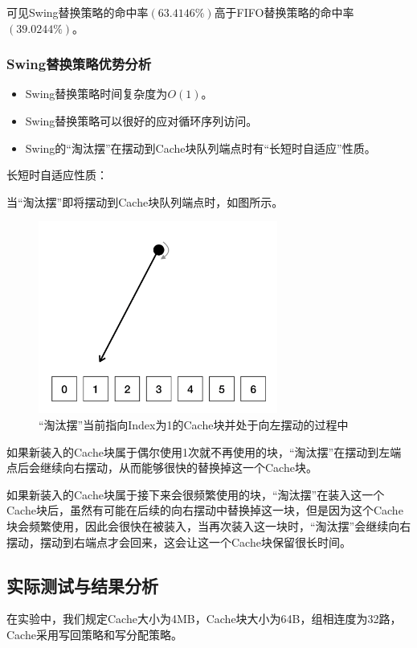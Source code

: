 \documentclass{article}
\begin{document}
可见Swing替换策略的命中率$(63.4146\%)$高于FIFO替换策略的命中率$(39.0244\%)$。

\subsubsection{Swing替换策略优势分析}
\begin{itemize}
	\item{Swing替换策略时间复杂度为$O(1)$。}
	\item{Swing替换策略可以很好的应对循环序列访问。}
	\item{Swing的“淘汰摆”在摆动到Cache块队列端点时有“长短时自适应”性质。}
\end{itemize}
长短时自适应性质：

当“淘汰摆”即将摆动到Cache块队列端点时，如图所示。
\begin{figure}[H]
    \centering
    \includegraphics[width=0.7\textwidth]{pic5.png}
    \caption{“淘汰摆”当前指向Index为1的Cache块并处于向左摆动的过程中}
\end{figure}
如果新装入的Cache块属于偶尔使用1次就不再使用的块，“淘汰摆”在摆动到左端点后会继续向右摆动，从而能够很快的替换掉这一个Cache块。

如果新装入的Cache块属于接下来会很频繁使用的块，“淘汰摆”在装入这一个Cache块后，虽然有可能在后续的向右摆动中替换掉这一块，但是因为这个Cache块会频繁使用，因此会很快在被装入，当再次装入这一块时，“淘汰摆”会继续向右摆动，摆动到右端点才会回来，这会让这一个Cache块保留很长时间。


\subsection{实际测试与结果分析}
在实验中，我们规定Cache大小为4MB，Cache块大小为64B，组相连度为32路，Cache采用写回策略和写分配策略。
\end{document}
